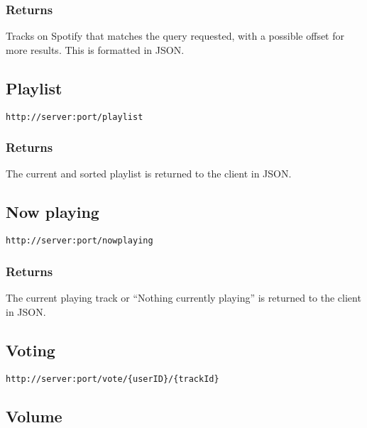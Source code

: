 \subsubsection{Returns}
Tracks on Spotify that matches the query requested, with a possible offset for more results. This is formatted in JSON.

\subsection{Playlist}

\begin{lstlisting}[label={lst:endpoint_playlist}, caption={Text surrounded by curly brackets are parameters.}]
http://server:port/playlist
\end{lstlisting}

\subsubsection{Returns}
The current and sorted playlist is returned to the client in JSON.

\subsection{Now playing}

\begin{lstlisting}[label={lst:endpoint_nowplaying}, caption={Text surrounded by curly brackets are parameters.}]
http://server:port/nowplaying
\end{lstlisting}

\subsubsection{Returns}
The current playing track or \enquote{Nothing currently playing} is returned to the client in JSON.

\subsection{Voting}

\begin{lstlisting}[label={lst:endpoint_vote}, caption={Text surrounded by curly brackets are parameters.}]
http://server:port/vote/{userID}/{trackId}
\end{lstlisting}


\subsection{Volume}


